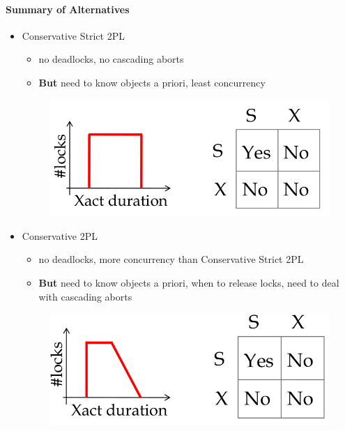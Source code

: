 \paragraph{Summary of Alternatives}
\begin{itemize}
\item Conservative Strict 2PL
  \begin{itemize}
  \item no deadlocks, no cascading aborts
  \item \textbf{But} need to know objects a priori, least concurrency
  \end{itemize}
\begin{figure}[h]
  \begin{minipage}{1.0\linewidth}
    \begin{center}
      \includegraphics[scale=0.15]{graphics/CS2PL.png}
    \end{center}
  \end{minipage}
\end{figure}

\item Conservative 2PL
  \begin{itemize}
  \item no deadlocks, more concurrency than Conservative Strict 2PL
  \item \textbf{But} need to know objects a priori, when to
    release locks, need to deal with cascading aborts
  \end{itemize}
\begin{figure}[h]
  \begin{minipage}{1.0\linewidth}
    \begin{center}
      \includegraphics[scale=0.15]{graphics/C2PL.png}
    \end{center}
  \end{minipage}
\end{figure}




\end{itemize}
